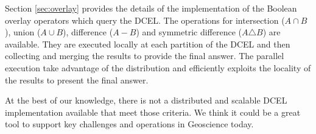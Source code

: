 Section \ref{sec:overlay} provides the details of the implementation of the Boolean overlay operators which query the DCEL.  The operations for intersection ($A \cap B$), union ($A \cup B$),  difference ($A - B$) and symmetric difference ($A \triangle B$) are available.  They are executed locally at each partition of the DCEL and then collecting and merging the results to provide the final answer.  The parallel execution take advantage of the distribution and efficiently exploits the locality of the results to present the final answer.

At the best of our knowledge, there is not a distributed and scalable DCEL implementation available that meet those criteria.  We think it could be a great tool to support key  challenges and operations in Geoscience today.